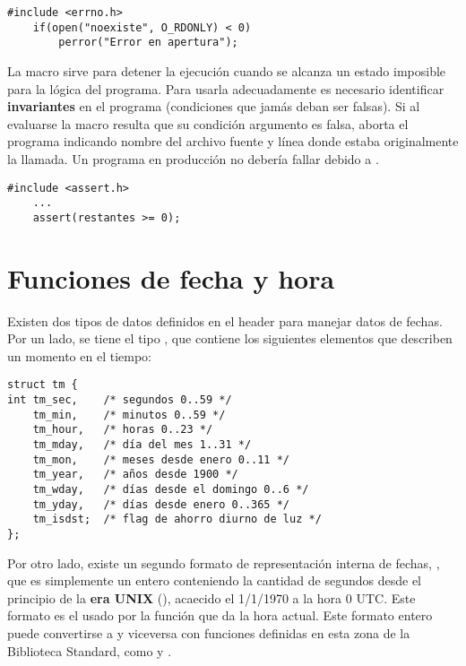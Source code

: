 \begin{ejemplo}
\begin{lstlisting}
#include <errno.h>
    if(open("noexiste", O_RDONLY) < 0)
        perror("Error en apertura");	
\end{lstlisting}
\end{ejemplo}

La macro  sirve para detener la ejecución cuando se alcanza un estado
imposible para la lógica del programa. Para usarla adecuadamente es necesario
identificar \textbf{invariantes} en el programa (condiciones que jamás deban ser
falsas). Si al evaluarse la macro resulta que su condición argumento es falsa,
 aborta el programa indicando nombre del archivo fuente y línea donde
estaba originalmente la llamada. Un programa en producción no debería fallar
debido a .


\begin{ejemplo}
\begin{lstlisting}
#include <assert.h>
    ...
    assert(restantes >= 0);
\end{lstlisting}
\end{ejemplo}

\section{Funciones de fecha y hora}
Existen dos tipos de datos definidos en el header  para manejar datos de fechas.
Por un lado, se tiene el tipo , que contiene los siguientes elementos
que describen un momento en el tiempo:

\begin{lstlisting}
struct tm {
int tm_sec,    /* segundos 0..59 */
    tm_min,    /* minutos 0..59 */
    tm_hour,   /* horas 0..23 */
    tm_mday,   /* día del mes 1..31 */
    tm_mon,    /* meses desde enero 0..11 */
    tm_year,   /* años desde 1900 */
    tm_wday,   /* días desde el domingo 0..6 */
    tm_yday,   /* días desde enero 0..365 */
    tm_isdst;  /* flag de ahorro diurno de luz */
};	
\end{lstlisting}

Por otro lado, existe un segundo formato de representación interna de fechas,
, que es simplemente un entero conteniendo la cantidad de segundos desde
el principio de la \textbf{era UNIX} (), acaecido el 1/1/1970 a la hora 0
UTC. Este formato es el usado por la función  que da la hora actual.
Este formato entero puede convertirse a  y viceversa con funciones
definidas en esta zona de la Biblioteca Standard, como  y .


